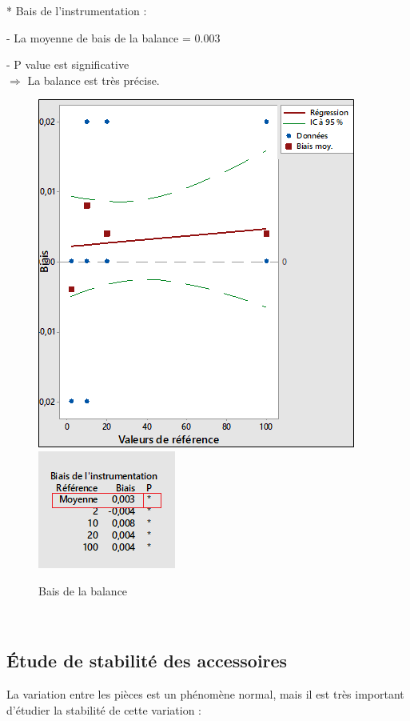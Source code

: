 \documentclass[12pt, a4paper]{thesis}
\begin{document}
 * Bais de l’instrumentation : \\
 \item - La moyenne de bais de la balance = 0.003 
\item - P value est significative\\
$\Longrightarrow$ La balance est très précise. 
\begin{figure}[!h]
\begin{center}
\includegraphics[scale=0.7]{qui.png}
\includegraphics[scale=0.9]{bais.png}
\caption{Bais de la balance}
\end{center}
\end{figure}
 
 
\\
 
\subsection{Étude de stabilité des accessoires}
La variation entre les pièces est un phénomène normal, mais il est très important d'étudier la stabilité de cette variation :
\end{document}
